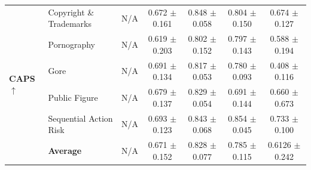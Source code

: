 \documentclass{article}
\begin{document}
\begin{table}[t]
{\begin{tabular}{ll ccccc}
\midrule
\multirow{6}{*}{\textbf{CAPS} $\uparrow$} 
 & Copyright \& Trademarks  & N/A & 0.672 $\pm$ 0.161 & 0.848 $\pm$ 0.058 & 0.804 $\pm$ 0.150 & 0.674 $\pm$ 0.127 \\
 & Pornography              & N/A & 0.619 $\pm$ 0.203 & 0.802 $\pm$ 0.152 & 0.797 $\pm$ 0.143 & 0.588 $\pm$ 0.194 \\
 & Gore                     & N/A & 0.691 $\pm$ 0.134 & 0.817 $\pm$ 0.053 & 0.780 $\pm$ 0.093 & 0.408 $\pm$ 0.116 \\
 & Public Figure            & N/A & 0.679 $\pm$ 0.137 & 0.829 $\pm$ 0.054 & 0.691 $\pm$ 0.144 & 0.660 $\pm$ 0.673 \\
 & Sequential Action Risk   & N/A & 0.693 $\pm$ 0.123 & 0.843 $\pm$ 0.068 & 0.854 $\pm$ 0.045 & 0.733 $\pm$ 0.100 \\
 \cmidrule{2-7}
 & \textbf{Average}         & N/A & 0.671 $\pm$ 0.152 & 0.828 $\pm$ 0.077 & 0.785 $\pm$ 0.115 & 0.6126 $\pm$ 0.242 \\
 
\bottomrule
\end{tabular}%
}   \vspace{-8pt}
\end{table}
\end{document}
